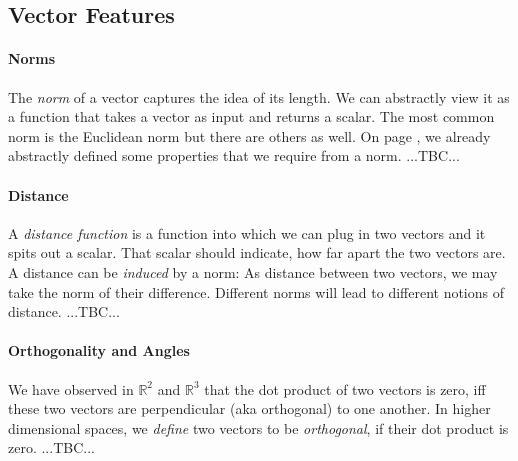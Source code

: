 \subsection{Vector Features}

\paragraph{Norms}
The \emph{norm} of a vector captures the idea of its length. We can abstractly view it as a function that takes a vector as input and returns a scalar. The most common norm is the Euclidean norm but there are others as well. On page \pageref{Tab:Norm}, we already abstractly defined some properties that we require from a norm. ...TBC...

\paragraph{Distance}
A \emph{distance function} is a function into which we can plug in two vectors and it spits out a scalar. That scalar should indicate, how far apart the two vectors are. A distance can be \emph{induced} by a norm: As distance between two vectors, we may take the norm of their difference. Different norms will lead to different notions of distance. ...TBC...




\paragraph{Orthogonality and Angles}
We have observed in $\mathbb{R}^2$ and $\mathbb{R}^3$ that the dot product of two vectors is zero, iff these two vectors are perpendicular (aka orthogonal) to one another. In higher dimensional spaces, we \emph{define} two vectors to be \emph{orthogonal}, if their dot product is zero. ...TBC...

% 

